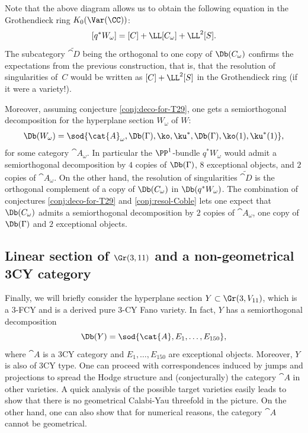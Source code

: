 \begin{remark}
Note that the above diagram allows us to obtain the following equation in the Grothendieck ring
$K_0(\Var(\CC))$:
\[
[q^* W_\omega] = [C] + \LL [C_\omega] + \LL^2 [S].
\]
The subcategory $\tilde{\cat{D}}$ being the orthogonal to one copy of $\Db(C_\omega)$ confirms
the expectations from the previous construction, that is, that the resolution of singularities of~$C$ would be written as $[C] + \LL^2 [S]$ in the Grothendieck ring (if it were a variety!).

Moreover, assuming conjecture \ref{conj:deco-for-T29}, one gets a semiorthogonal decomposition
for the hyperplane section $W_\omega$ of $W$:
\[
\Db(W_\omega) = \sod{\cat{A}_\omega,\Db(\Gamma),\ko,\ku^*,\Db(\Gamma),\ko(1),\ku^*(1)},
\]
for some category $\cat{A}_\omega$. In particular the $\PP^1$-bundle $q^* W_\omega$ would admit
a semiorthogonal decomposition by $4$ copies of $\Db(\Gamma)$, $8$ exceptional objects, and $2$ copies
of $\cat{A}_\omega$. On the other hand, the resolution of singularities $\tilde{\cat{D}}$ is the orthogonal
complement of a copy of $\Db(C_\omega)$ in $\Db(q^*W_\omega)$. The combination of conjectures
\ref{conj:deco-for-T29} and \ref{conj:resol-Coble} lets one expect that $\Db(C_\omega)$
admits a semiorthogonal decomposition by $2$ copies of $\cat{A}_\omega$, one copy of $\Db(\Gamma)$
and $2$ exceptional objects.
\end{remark}

\subsection{Linear section of $\Gr(3,11)$ and a non-geometrical 3CY category}
Finally, we will briefly consider the hyperplane section $Y \subset \Gr(3,V_{11})$, which is a 3-FCY and is a derived pure 3-CY Fano variety. In fact, $Y$ has a semiorthogonal
decomposition
\[
\Db(Y)= \sod{\cat{A},E_1,\ldots,E_{150}},
\]
where $\cat{A}$ is a 3CY category \cite{kuz-fractional} and $E_1,\ldots,E_{150}$ are
exceptional objects. Moreover, $Y$ is also of 3CY type. One can proceed with correspondences
induced by jumps and projections to spread the Hodge structure and (conjecturally) the category $\cat{A}$
in other varieties. A quick analysis of the possible target varieties easily leads to show that there is
no geometrical Calabi-Yau threefold in the picture. On the other hand, one can also show that
for numerical reasons, the category $\cat{A}$ cannot be geometrical.

